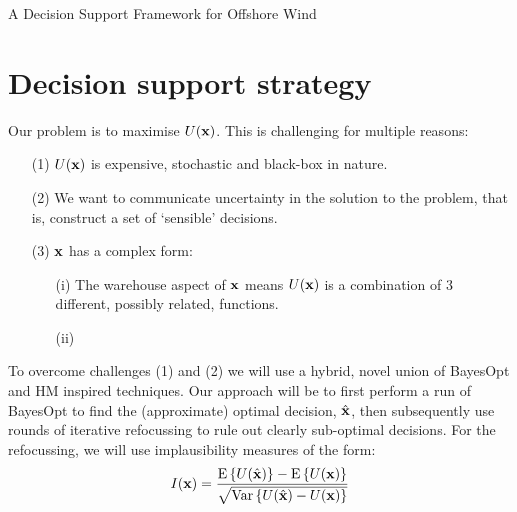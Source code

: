 \begin{chapter}{A Decision Support Framework for Offshore Wind \label{Ch:ds-for-ow}}
\section{Decision support strategy}
Our problem is to maximise $U(\mathbf{x})$. This is challenging for multiple reasons:
\begin{itemize}
 \item[(1)] $U(\mathbf{x})$ is expensive, stochastic and black-box in nature.
 \item[(2)] We want to communicate uncertainty in the solution to the problem, that is, construct a set of `sensible' decisions.
 \item[(3)] $\mathbf{x}$ has a complex form:
 \begin{itemize}
  \item[(i)] The warehouse aspect of $\mathbf{x}$ means $U(\mathbf{x})$ is a combination of $3$ different, possibly related, functions.
  \item[(ii)] 
 \end{itemize}
\end{itemize}
To overcome challenges (1) and (2) we will use a hybrid, novel union of BayesOpt and HM inspired techniques. Our approach will be to first perform a run of BayesOpt to find the (approximate) optimal decision, $\hat{\mathbf{x}}$, then subsequently use rounds of iterative refocussing to rule out clearly sub-optimal decisions. For the refocussing, we will use implausibility measures of the form:
\begin{equation}
 I(\mathbf{x}) = \frac{\textrm{E}\,\{ U(\hat{\mathbf{x}}) \} - \textrm{E}\,\{ U(\mathbf{x}) \}}{\sqrt{\mathrm{Var}\, \{U(\hat{\mathbf{x}}) - U(\mathbf{x}) \}}} \label{Eq:base-implaus}
\end{equation}

\end{chapter}
